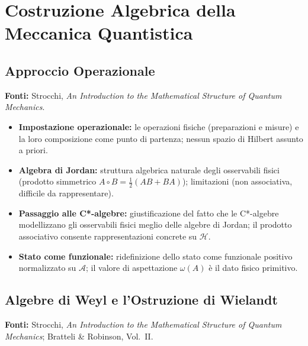 \documentclass[12pt, a4paper]{article}
\newcommand{\fonti}[1]{%
	\begin{fontebox}
		\textcolor{fontecolor}{\footnotesize\textbf{Fonti:} #1}
	\end{fontebox}%
}
\begin{document}
	\newpage
	\section{Costruzione Algebrica della Meccanica Quantistica}
	
	\subsection{Approccio Operazionale}
	
	\fonti{Strocchi, \textit{An Introduction to the Mathematical Structure of Quantum Mechanics}.}
	
	\begin{itemize}
		\item \textbf{Impostazione operazionale:} le operazioni fisiche (preparazioni e misure) e la loro composizione come punto di partenza; nessun spazio di Hilbert assunto a priori.
		\item \textbf{Algebra di Jordan:} struttura algebrica naturale degli osservabili fisici (prodotto simmetrico $A \circ B = \frac{1}{2}(AB+BA)$); limitazioni (non associativa, difficile da rappresentare).
		\item \textbf{Passaggio alle C*-algebre:} giustificazione del fatto che le C*-algebre modellizzano gli osservabili fisici meglio delle algebre di Jordan; il prodotto associativo consente rappresentazioni concrete su $\mathcal{H}$.
		\item \textbf{Stato come funzionale:} ridefinizione dello stato come funzionale positivo normalizzato su $\mathcal{A}$; il valore di aspettazione $\omega(A)$ è il dato fisico primitivo.
	\end{itemize}
	
	\subsection{Algebre di Weyl e l'Ostruzione di Wielandt}
	
	\fonti{Strocchi, \textit{An Introduction to the Mathematical Structure of Quantum Mechanics}; Bratteli \& Robinson, Vol.~II.}
	
\end{document}
